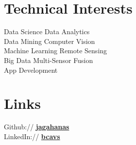 \documentclass[letterpaper]{deedy-resume} %
\begin{document}
\begin{minipage}[t]{0.30\textwidth}
\sectionspace %



\section{Technical Interests}
Data Science \textbullet{} Data Analytics \\
Data Mining \textbullet{} Computer Vision \\
Machine Learning \textbullet{} Remote Sensing \\
Big Data \textbullet{} Multi-Sensor Fusion \\
App Development 

\sectionspace %


\section{Links} 

Github:// \href{https://github.com/jagahanas}{\bf jagahanas} \\
LinkedIn:// \href{https://www.linkedin.com/in/bcavs/}{\bf bcavs}

%
%

\sectionspace %


\end{minipage}
\end{document}

